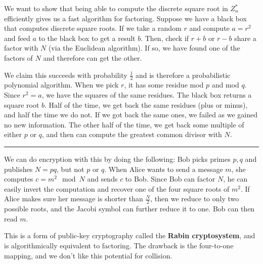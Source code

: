\documentclass[twoside]{article}
\newenvironment{proof}{{\bf Proof:}}{\hfill\rule{2mm}{2mm}}
\begin{document}
\begin{proof}
	We want to show that being able to compute the discrete square root in $Z_n^*$ efficiently gives us a fast algorithm for factoring.  Suppose we have a black box that computes discrete square roots.  If we take a random $r$ and compute $a=r^2$ and feed $a$ to the black box to get a result $b$.  Then, check if $r+b$ or $r-b$ share a factor with $N$ (via the Euclidean algorithm).  If so, we have found one of the factors of $N$ and therefore can get the other.
	
	We claim this succeeds with probability $\frac{1}{2}$ and is therefore a probabilistic polynomial algorithm.  When we pick $r$, it has some residue mod $p$ and mod $q$.  Since $r^2=a$, we have the squares of the same residues.  The black box returns a square root $b$.  Half of the time, we get back the same residues (plus or minus), and half the time we do not.  If we got back the same ones, we failed as we gained no new information.  The other half of the time, we get back some multiple of either $p$ or $q$, and then can compute the greatest common divisor with $N$.
\end{proof}

We can do encryption with this by doing the following: Bob picks primes $p,q$ and publishes $N=pq$, but not $p$ or $q$.  When Alice wants to send a message $m$, she computes $c=m^2\mod N$ and sends $c$ to Bob.  Since Bob can factor $N$, he can easily invert the computation and recover one of the four square roots of $m^2$.  If Alice makes sure her message is shorter than $\frac{N}{2}$, then we reduce to only two possible roots, and the Jacobi symbol can further reduce it to one.  Bob can then read $m$.

This is a form of public-key cryptography called the \textbf{Rabin cryptosystem}, and is algorithmically equivalent to factoring.  The drawback is the four-to-one mapping, and we don't like this potential for collision.




 
\end{document}
